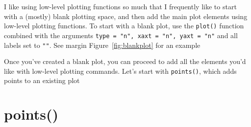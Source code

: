 \documentclass{tufte-book}\usepackage[]{graphicx}\usepackage[]{color}
\begin{document}
I like using low-level plotting functions so much that I frequently like to start with a (mostly) blank plotting space, and then add the main plot elements using low-level plotting functions. To start with a blank plot, use the \texttt{plot()} function combined with the arguments \texttt{type = "n", xaxt = "n", yaxt = "n"} and all labels set to \texttt{""}. See margin Figure~\ref{fig:blankplot} for an example

Once you've created a blank plot, you can proceed to add all the elements you'd like with low-level plotting commands. Let's start with \texttt{points()}, which adds points to an existing plot

\section{points()}
\end{document}
